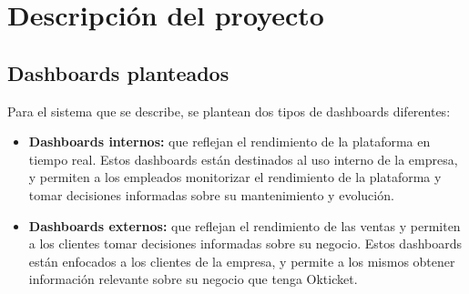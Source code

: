 \section{Descripción del proyecto}\label{sec:descripcion}
%

\subsection{Dashboards planteados}
Para el sistema que se describe, se plantean dos tipos de dashboards diferentes:

\begin{itemize}
	\item \textbf{Dashboards internos:} que reflejan el rendimiento de la
		plataforma en tiempo real. Estos dashboards están destinados al uso
		interno de la empresa, y permiten a los empleados monitorizar el
		rendimiento de la plataforma y tomar decisiones informadas sobre su
		mantenimiento y evolución.
	\item \textbf{Dashboards externos:} que reflejan el rendimiento de las
		ventas y permiten a los clientes tomar decisiones informadas sobre su
		negocio. Estos dashboards están enfocados a los clientes de la empresa,
		y permite a los mismos obtener información relevante sobre su negocio
		que tenga Okticket.
\end{itemize}
